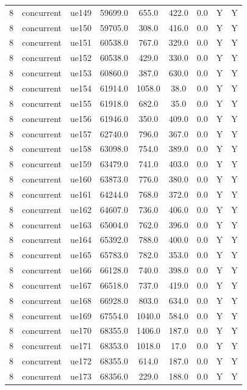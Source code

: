 \begin{table}[ht]
\begin{tabular}{|c|c|c|c|c|c|c|c|c|}
8 & concurrent & ue149 & 59699.0 & 655.0 & 422.0 & 0.0 & Y & Y \\
8 & concurrent & ue150 & 59705.0 & 308.0 & 416.0 & 0.0 & Y & Y \\
8 & concurrent & ue151 & 60538.0 & 767.0 & 329.0 & 0.0 & Y & Y \\
8 & concurrent & ue152 & 60538.0 & 429.0 & 330.0 & 0.0 & Y & Y \\
8 & concurrent & ue153 & 60860.0 & 387.0 & 630.0 & 0.0 & Y & Y \\
8 & concurrent & ue154 & 61914.0 & 1058.0 & 38.0 & 0.0 & Y & Y \\
8 & concurrent & ue155 & 61918.0 & 682.0 & 35.0 & 0.0 & Y & Y \\
8 & concurrent & ue156 & 61946.0 & 350.0 & 409.0 & 0.0 & Y & Y \\
8 & concurrent & ue157 & 62740.0 & 796.0 & 367.0 & 0.0 & Y & Y \\
8 & concurrent & ue158 & 63098.0 & 754.0 & 389.0 & 0.0 & Y & Y \\
8 & concurrent & ue159 & 63479.0 & 741.0 & 403.0 & 0.0 & Y & Y \\
8 & concurrent & ue160 & 63873.0 & 776.0 & 380.0 & 0.0 & Y & Y \\
8 & concurrent & ue161 & 64244.0 & 768.0 & 372.0 & 0.0 & Y & Y \\
8 & concurrent & ue162 & 64607.0 & 736.0 & 406.0 & 0.0 & Y & Y \\
8 & concurrent & ue163 & 65004.0 & 762.0 & 396.0 & 0.0 & Y & Y \\
8 & concurrent & ue164 & 65392.0 & 788.0 & 400.0 & 0.0 & Y & Y \\
8 & concurrent & ue165 & 65783.0 & 782.0 & 353.0 & 0.0 & Y & Y \\
8 & concurrent & ue166 & 66128.0 & 740.0 & 398.0 & 0.0 & Y & Y \\
8 & concurrent & ue167 & 66518.0 & 737.0 & 419.0 & 0.0 & Y & Y \\
8 & concurrent & ue168 & 66928.0 & 803.0 & 634.0 & 0.0 & Y & Y \\
8 & concurrent & ue169 & 67554.0 & 1040.0 & 584.0 & 0.0 & Y & Y \\
8 & concurrent & ue170 & 68355.0 & 1406.0 & 187.0 & 0.0 & Y & Y \\
8 & concurrent & ue171 & 68353.0 & 1018.0 & 17.0 & 0.0 & Y & Y \\
8 & concurrent & ue172 & 68355.0 & 614.0 & 187.0 & 0.0 & Y & Y \\
8 & concurrent & ue173 & 68356.0 & 229.0 & 188.0 & 0.0 & Y & Y \\

\end{tabular}
\end{table}
